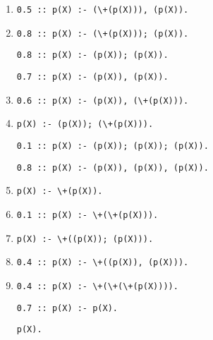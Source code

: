 \begin{enumerate}[label=\arabic*.]
\item
\begin{verbatim}
0.5 :: p(X) :- (\+(p(X))), (p(X)).
\end{verbatim}
\item
\begin{verbatim}
0.8 :: p(X) :- (\+(p(X))); (p(X)).
\end{verbatim}
\hlitem
\begin{verbatim}
0.8 :: p(X) :- (p(X)); (p(X)).
\end{verbatim}
\hlitem
\begin{verbatim}
0.7 :: p(X) :- (p(X)), (p(X)).
\end{verbatim}
\item
\begin{verbatim}
0.6 :: p(X) :- (p(X)), (\+(p(X))).
\end{verbatim}
\item
\begin{verbatim}
p(X) :- (p(X)); (\+(p(X))).
\end{verbatim}
\hlitem
\begin{verbatim}
0.1 :: p(X) :- (p(X)); (p(X)); (p(X)).
\end{verbatim}
\hlitem
\begin{verbatim}
0.8 :: p(X) :- (p(X)), (p(X)), (p(X)).
\end{verbatim}
\item
\begin{verbatim}
p(X) :- \+(p(X)).
\end{verbatim}
\item
\begin{verbatim}
0.1 :: p(X) :- \+(\+(p(X))).
\end{verbatim}
\item
\begin{verbatim}
p(X) :- \+((p(X)); (p(X))).
\end{verbatim}
\item
\begin{verbatim}
0.4 :: p(X) :- \+((p(X)), (p(X))).
\end{verbatim}
\item
\begin{verbatim}
0.4 :: p(X) :- \+(\+(\+(p(X)))).
\end{verbatim}
\hlitem
\begin{verbatim}
0.7 :: p(X) :- p(X).
\end{verbatim}
\hlitem
\begin{verbatim}
p(X).
\end{verbatim}
\end{enumerate}

